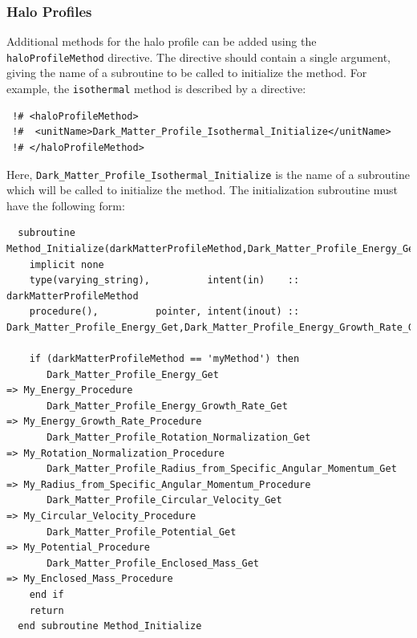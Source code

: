 \subsubsection{Halo Profiles}

Additional methods for the halo profile can be added using the {\tt haloProfileMethod} directive. The directive should contain a single argument, giving the name of a subroutine to be called to initialize the method. For example, the {\tt isothermal} method is described by a directive:
\begin{verbatim}
 !# <haloProfileMethod>
 !#  <unitName>Dark_Matter_Profile_Isothermal_Initialize</unitName>
 !# </haloProfileMethod>
\end{verbatim}
Here, {\tt Dark\_Matter\_Profile\_Isothermal\_Initialize} is the name of a subroutine which will be called to initialize the method. The initialization subroutine must have the following form:
\begin{verbatim}
  subroutine Method_Initialize(darkMatterProfileMethod,Dark_Matter_Profile_Energy_Get,Dark_Matter_Profile_Energy_Growth_Rate_Get,Dark_Matter_Profile_Rotation_Normalization_Get,Dark_Matter_Profile_Radius_from_Specific_Angular_Momentum_Get,Dark_Matter_Profile_Circular_Velocity_Get,Dark_Matter_Profile_Potential_Get,Dark_Matter_Profile_Enclosed_Mass_Get)
    implicit none
    type(varying_string),          intent(in)    :: darkMatterProfileMethod
    procedure(),          pointer, intent(inout) :: Dark_Matter_Profile_Energy_Get,Dark_Matter_Profile_Energy_Growth_Rate_Get,Dark_Matter_Profile_Rotation_Normalization_Get,Dark_Matter_Profile_Radius_from_Specific_Angular_Momentum_Get,Dark_Matter_Profile_Circular_Velocity_Get,Dark_Matter_Profile_Potential_Get,Dark_Matter_Profile_Enclosed_Mass_Get
    
    if (darkMatterProfileMethod == 'myMethod') then
       Dark_Matter_Profile_Energy_Get                                => My_Energy_Procedure
       Dark_Matter_Profile_Energy_Growth_Rate_Get                    => My_Energy_Growth_Rate_Procedure
       Dark_Matter_Profile_Rotation_Normalization_Get                => My_Rotation_Normalization_Procedure
       Dark_Matter_Profile_Radius_from_Specific_Angular_Momentum_Get => My_Radius_from_Specific_Angular_Momentum_Procedure
       Dark_Matter_Profile_Circular_Velocity_Get                     => My_Circular_Velocity_Procedure
       Dark_Matter_Profile_Potential_Get                             => My_Potential_Procedure
       Dark_Matter_Profile_Enclosed_Mass_Get                         => My_Enclosed_Mass_Procedure
    end if
    return
  end subroutine Method_Initialize
\end{verbatim}
